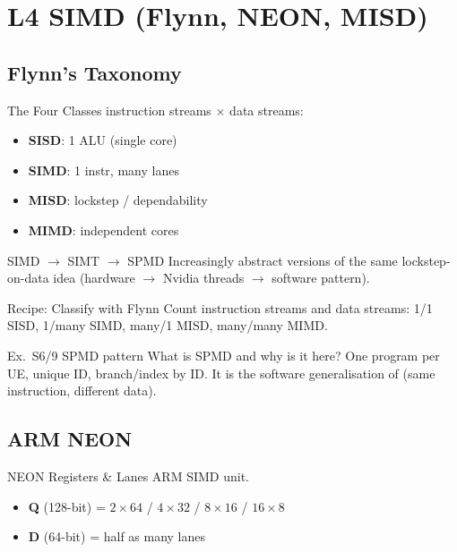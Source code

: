 \section{L4 SIMD (Flynn, NEON, MISD)}

\subsection{Flynn's Taxonomy}


\begin{definition}{The Four Classes}
    instruction streams $\times$ data streams:
    \begin{itemize}
        \item \textbf{SISD}: 1 ALU (single core)
        \item \textbf{SIMD}: 1 instr, many lanes
        \item \textbf{MISD}: lockstep / dependability
        \item \textbf{MIMD}: independent cores
    \end{itemize}
\end{definition}

\begin{concept}{SIMD $\to$ SIMT $\to$ SPMD}
    Increasingly abstract versions of the same lockstep-on-data idea (hardware $\to$ Nvidia threads $\to$ software pattern).
\end{concept}

\multend

\begin{KR}{Recipe: Classify with Flynn}
    Count instruction streams and data streams: 1/1 SISD, 1/many SIMD, many/1 MISD, many/many MIMD.
\end{KR}

\begin{example2}{Ex.\ S6/9 SPMD pattern}
    What is SPMD and why is it here?
    \tcblower
    One program per UE, unique ID, branch/index by ID. It is the software generalisation of  (same instruction, different data).
\end{example2}

\subsection{ARM NEON}

\begin{definition}{NEON Registers \& Lanes}
    ARM SIMD unit.
    \begin{itemize}
        \item \textbf{Q} (128-bit) = $2{\times}64$ / $4{\times}32$ / $8{\times}16$ / $16{\times}8$
        \item \textbf{D} (64-bit) = half as many lanes
    \end{itemize}
\end{definition}

